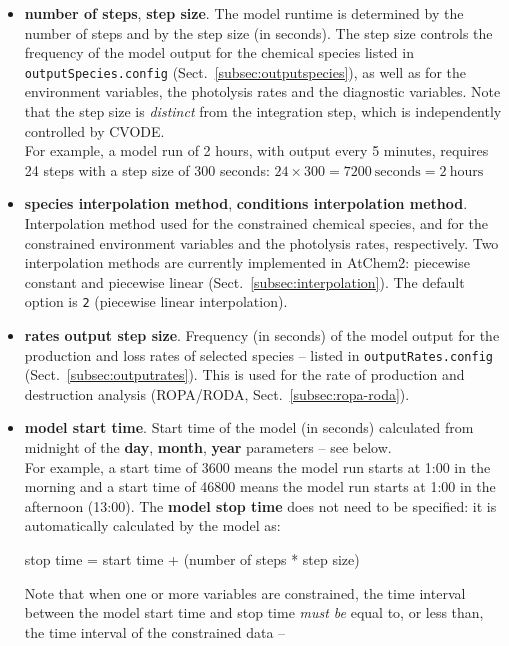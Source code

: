 \begin{itemize}
\item \textbf{number of steps}, \textbf{step size}. The model runtime
  is determined by the number of steps and by the step size (in
  seconds). The step size controls the frequency of the model output
  for the chemical species listed in \texttt{outputSpecies.config}
  (Sect.~\ref{subsec:outputspecies}), as well as for the environment
  variables, the photolysis rates and the diagnostic variables. Note
  that the step size is \emph{distinct} from the integration step,
  which is independently controlled by CVODE.\\
  For example, a model run of 2 hours, with output every 5 minutes,
  requires 24 steps with a step size of 300 seconds:
  $24 \times 300 = 7200~\mathrm{seconds} = 2~\mathrm{hours}$
\item \textbf{species interpolation method}, \textbf{conditions interpolation method}.
  Interpolation method used for the constrained chemical species, and
  for the constrained environment variables and the photolysis rates,
  respectively. Two interpolation methods are currently implemented in
  AtChem2: piecewise constant and piecewise linear
  (Sect.~\ref{subsec:interpolation}). The default option is \texttt{2}
  (piecewise linear interpolation).
\item \textbf{rates output step size}. Frequency (in seconds) of the
  model output for the production and loss rates of selected species --
  listed in \texttt{outputRates.config} (Sect.~\ref{subsec:outputrates}).
  This is used for the rate of production and destruction analysis
  (ROPA/RODA, Sect.~\ref{subsec:ropa-roda}).
\item \textbf{model start time}. Start time of the model (in seconds)
  calculated from midnight of the \textbf{day}, \textbf{month},
  \textbf{year} parameters -- see below.\\
  For example, a start time of 3600 means the model run starts at 1:00
  in the morning and a start time of 46800 means the model run starts
  at 1:00 in the afternoon (13:00). The \textbf{model stop time} does
  not need to be specified: it is automatically calculated by the
  model as:
  \begin{center}
    stop time = start time + (number of steps * step size)
  \end{center}
  Note that when one or more variables are constrained, the time
  interval between the model start time and stop time \emph{must be}
  equal to, or less than, the time interval of the constrained data --

\end{itemize}
